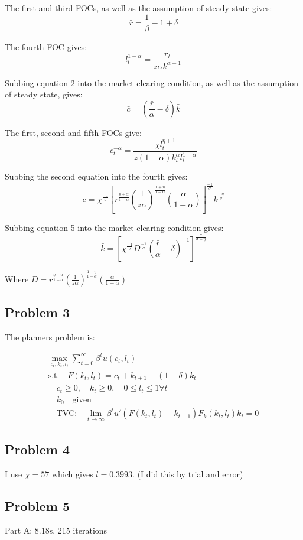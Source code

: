 \documentclass{article}
\begin{document}
The first and third FOCs, as well as the assumption of steady state gives: 
\begin{equation}
    \bar{r} = \frac{1}{\beta} - 1 + \delta
\end{equation}

The fourth FOC gives:
\begin{equation}
    l_t^{1-\alpha} = \frac{r_t}{z \alpha k^{\alpha - 1}} 
\end{equation}

Subbing equation 2 into the market clearing condition, as well as the assumption of steady state, gives: 
\begin{equation}
    \bar{c} = (\frac{\bar{r}}{\alpha} - \delta) \bar{k}
\end{equation}

The first, second and fifth FOCs give: 
\begin{equation}
    c_t^{-\alpha} = \frac{\chi l_t^{\eta+1}}{z(1-\alpha) k_t^\alpha l_t^{1-\alpha}}
\end{equation}

Subbing the second equation into the fourth gives:
\begin{equation}
    \bar{c} = \chi^{\frac{-1}{\sigma}} [r^{\frac{\eta + \alpha}{1-\alpha}}(\frac{1}{z\alpha})^{\frac{1+\eta}{1-\alpha}}
    (\frac{\alpha}{1-\alpha})]^{\frac{-1}{\sigma}} k^{\frac{-\eta}{\sigma}}
\end{equation}

Subbing equation 5 into the market clearing condition gives: 
\begin{equation}
    \bar{k} = [\chi^{\frac{-1}{\sigma}} D^{\frac{-1}{\sigma}}(\frac{\bar{r}}{\alpha}-\delta)^{-1}]^{\frac{\sigma}{\sigma+\eta}}
\end{equation}

Where $D = r^{\frac{\eta + \alpha}{1-\alpha}}(\frac{1}{z\alpha})^{\frac{1+\eta}{1-\alpha}}(\frac{\alpha}{1-\alpha})$

\subsection*{Problem 3}
The planners problem is: 

\begin{gather*}
    \max_{c_t, k_t, l_t} \sum_{t=0}^{\infty} \beta^t u(c_t, l_t) \\
    \text{s.t.} \quad F(k_t, l_t) = c_t + k_{t+1} - (1 - \delta) k_t \\
    \quad c_t \geq 0, \quad k_t \geq 0, \quad 0 \leq l_t \leq 1 \forall t \\
    \quad k_0 \quad \text{given} \\
    \quad \text{TVC:} \quad \lim_{t \rightarrow \infty} \beta^t u'(F(k_t, l_t) - k_{t+1})F_k(k_t, l_t)k_t = 0 
\end{gather*}

\subsection*{Problem 4}
I use $\chi = 57$ which gives $\bar{l} = 0.3993$. (I did this by trial and error)

\subsection*{Problem 5}
Part A: 8.18s, 215 iterations \\
\end{document}
